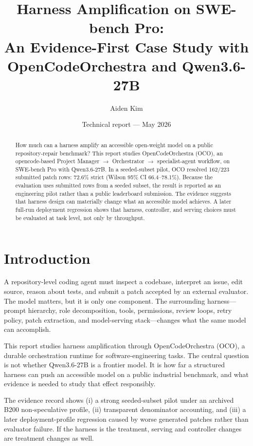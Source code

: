 \documentclass[11pt]{article}
\title{Harness Amplification on SWE-bench Pro:\\
An Evidence-First Case Study with OpenCodeOrchestra and Qwen3.6-27B}
\author{Aiden Kim}
\date{Technical report --- May 2026}
\begin{document}
\maketitle

\begin{abstract}
How much can a harness amplify an accessible open-weight model on a public repository-repair benchmark? This report studies OpenCodeOrchestra (OCO), an opencode-based Project Manager $\rightarrow$ Orchestrator $\rightarrow$ specialist-agent workflow, on SWE-bench Pro with Qwen3.6-27B. In a seeded-subset pilot, OCO resolved 162/223 submitted patch rows: 72.6\% strict (Wilson 95\% CI 66.4--78.1\%). Because the evaluation uses submitted rows from a seeded subset, the result is reported as an engineering pilot rather than a public leaderboard submission. The evidence suggests that harness design can materially change what an accessible model achieves. A later full-run deployment regression shows that harness, controller, and serving choices must be evaluated at task level, not only by throughput.
\end{abstract}

\section{Introduction}

A repository-level coding agent must inspect a codebase, interpret an issue, edit source, reason about tests, and submit a patch accepted by an external evaluator. The model matters, but it is only one component. The surrounding harness---prompt hierarchy, role decomposition, tools, permissions, review loops, retry policy, patch extraction, and model-serving stack---changes what the same model can accomplish.

This report studies harness amplification through OpenCodeOrchestra (OCO), a durable orchestration runtime for software-engineering tasks. The central question is not whether Qwen3.6-27B is a frontier model. It is how far a structured harness can push an accessible model on a public industrial benchmark, and what evidence is needed to study that effect responsibly.

The evidence record shows (i) a strong seeded-subset pilot under an archived B200 non-speculative profile, (ii) transparent denominator accounting, and (iii) a later deployment-profile regression caused by worse generated patches rather than evaluator failure. If the harness is the treatment, serving and controller changes are treatment changes as well.
\end{document}
